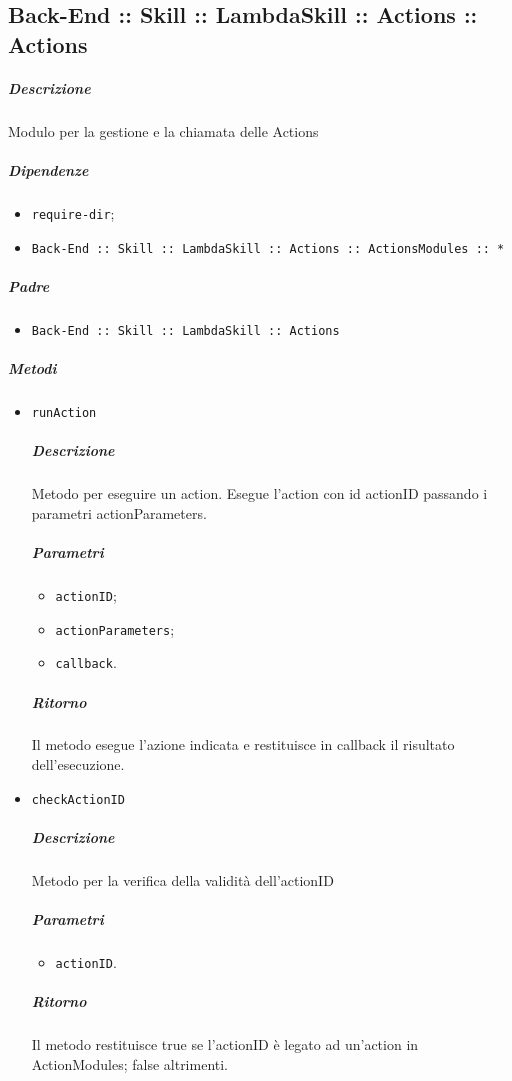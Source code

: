 \documentclass[../ManualeSviluppatore_v2.0.0.tex]{subfiles}
\begin{document}
\subsection{Back-End :: Skill :: LambdaSkill :: Actions :: Actions}
\subparagraph{Descrizione} Modulo per la gestione e la chiamata delle Actions
\subparagraph{Dipendenze}
\begin{itemize}
	\item \texttt{require-dir};
	\item \texttt{Back-End :: Skill :: LambdaSkill :: Actions :: ActionsModules :: *}
\end{itemize}
\subparagraph{Padre}
\begin{itemize}
	\item \texttt{Back-End :: Skill :: LambdaSkill :: Actions}
\end{itemize}
\subparagraph{Metodi}
\begin{itemize}
	\item \texttt{runAction}
	      \subparagraph{Descrizione} Metodo per eseguire un action. Esegue l'action con id actionID passando i parametri actionParameters.
	      \subparagraph{Parametri}
	      \begin{itemize}
	      	\item \texttt{actionID};
	      	\item \texttt{actionParameters};
	      	\item \texttt{callback}.
	      \end{itemize}
	      \subparagraph{Ritorno} Il metodo esegue l'azione indicata e restituisce in callback il risultato dell'esecuzione.
	\item \texttt{checkActionID}
	      \subparagraph{Descrizione} Metodo per la verifica della validità dell'actionID
	      \subparagraph{Parametri}
	      \begin{itemize}
	      	\item \texttt{actionID}.
	      \end{itemize}
	      \subparagraph{Ritorno} Il metodo restituisce true se l'actionID è legato ad un'action in ActionModules; false altrimenti.
\end{itemize}
\end{document}
